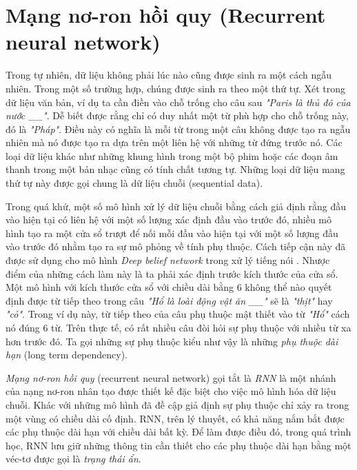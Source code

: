 \section{Mạng nơ-ron hồi quy (Recurrent neural network)} \label{rnnsection}

Trong tự nhiên, dữ liệu không phải lúc nào cũng được sinh ra một cách ngẫu nhiên. Trong một số trường hợp, chúng được sinh ra theo một thứ tự. Xét trong dữ liệu văn bản, ví dụ ta cần điền vào chỗ trống cho câu sau \textit{"Paris là thủ đô của nước \_\_"}. Dễ biết được rằng chỉ có duy nhất một từ phù hợp cho chỗ trống này, đó là \textit{"Pháp"}. Điều này có nghĩa là mỗi từ trong một câu không được tạo ra ngẫu nhiên mà nó được tạo ra dựa trên một liên hệ với những từ đứng trước nó. Các loại dữ liệu khác như những khung hình trong một bộ phim hoặc các đoạn âm thanh trong một bản nhạc cũng có tính chất tương tự. Những loại dữ liệu mang thứ tự này được gọi chung là dữ liệu chuỗi (sequential data).

Trong quá khứ, một số mô hình xử lý dữ liệu chuỗi bằng cách giả định rằng đầu vào hiện tại có liên hệ với một số lượng xác định đầu vào trước đó, nhiều mô hình tạo ra một cửa sổ trượt để nối mỗi đầu vào hiện tại với một số lượng đầu vào trước đó nhằm tạo ra sự mô phỏng về tính phụ thuộc. Cách tiếp cận này đã được sử dụng cho mô hình \textit{Deep belief network} trong xử lý tiếng nói \cite{massetal2012}. Nhược điểm của những cách làm này là ta phải xác định trước kích thước của cửa sổ. Một mô hình với kích thước cửa sổ với chiều dài bằng 6 không thể nào quyết định được từ tiếp theo trong câu \textit{"Hổ là loài động vật ăn \_\_"} sẽ là \textit{"thịt"} hay \textit{"cỏ"}. Trong ví dụ này, từ tiếp theo của câu phụ thuộc mật thiết vào từ \textit{"Hổ"} cách nó đúng 6 từ. Trên thực tế, có rất nhiều câu đòi hỏi sự phụ thuộc với nhiều từ xa hơn trước đó. Ta gọi những sự phụ thuộc kiểu như vậy là những \textit{phụ thuộc dài hạn} (long term dependency). 

\textit{Mạng nơ-ron hồi quy} (recurrent neural network) \cite{elman1990} gọi tắt là \textit{RNN} là một nhánh của nạng nơ-ron nhân tạo được thiết kế đặc biệt cho việc mô hình hóa dữ liệu chuỗi. Khác với những mô hình đã đề cập giả định sự phụ thuộc chỉ xảy ra trong một vùng có chiều dài cố định. RNN, trên lý thuyết, có khả năng nắm bắt được các phụ thuộc dài hạn với chiều dài bất kỳ. Để làm được điều đó, trong quá trình học, RNN lưu giữ những thông tin cần thiết cho các phụ thuộc dài hạn bằng một véc-tơ được gọi là \textit{trạng thái ẩn}.

